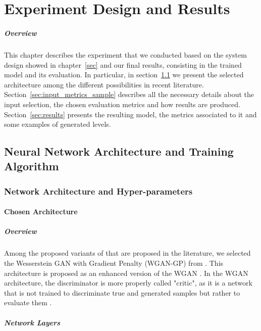 \chapter{Experiment Design and Results}
\paragraph{Overview} This chapter describes the experiment that we conducted based on the system design showed in chapter~\ref{sec} and our final results, consisting in the trained model and its evaluation. In particular, in section~\ref{sec:nn} we present the selected architecture among the different possibilities in recent literature. Section~\ref{sec:input_metrics_sample} describes all the necessary details about the input selection, the chosen evaluation metrics and how results are produced. Section~\ref{sec:results} presents the resulting model, the metrics associated to it and some examples of generated levels. 
\section{Neural Network Architecture and Training Algorithm}
\label{sec:nn}
\subsection{Network Architecture and Hyper-parameters}
\label{sec:networkarch}

\subsubsection{Chosen Architecture}
\paragraph{Overview} Among the proposed variants of  that are proposed in the literature, we selected the Wesserstein GAN with Gradient Penalty \cite{wgangp} (WGAN-GP) from \citeauthor{wgangp}. This architecture is proposed as an enhanced version of the WGAN \cite{wgan}. In the WGAN architecture, the discriminator is more properly called "critic", as it is a network that is not trained to discriminate  true and generated samples but rather to evaluate them \citeauthor{wgangp}.%

\paragraph{Network Layers}

